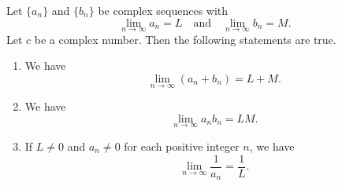 \begin{theorem}
  Let $\{a_n\}$ and $\{b_n\}$ be complex sequences with
  \begin{equation*}
    \lim_{n \to \infty} a_n = L
    \quad \text{and} \quad
    \lim_{n \to \infty} b_n = M.
  \end{equation*}
  Let $c$ be a complex number.
  Then the following statements are true.
  \begin{enumerate}
    \item We have
    \begin{equation*}
      \lim_{n \to \infty} (a_n + b_n) = L + M.
    \end{equation*}
    \item We have
    \begin{equation*}
      \lim_{n \to \infty} a_nb_n = LM.
    \end{equation*}
    \item If $L \neq 0$ and $a_n \neq 0$ for each positive integer $n$, we have
    \begin{equation*}
      \lim_{n \to \infty} \frac{1}{a_n} = \frac{1}{L}.
    \end{equation*}
  \end{enumerate}
\end{theorem}
